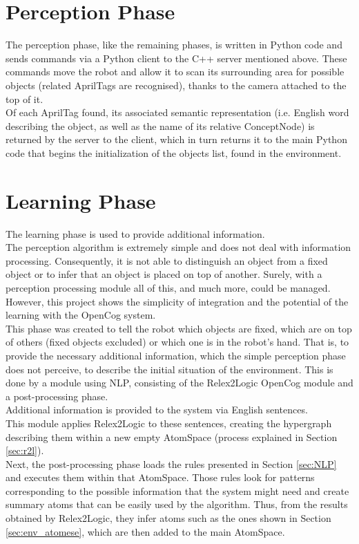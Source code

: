 \section{Perception Phase}\label{sec:perception}

The perception phase, like the remaining phases, is written in Python code and sends commands via a Python client to the C++ server mentioned above. These commands move the robot and allow it to scan its surrounding area for possible objects (related AprilTags are recognised), thanks to the camera attached to the top of it. \\
Of each AprilTag found, its associated semantic representation (i.e. English word describing the object, as well as the name of its relative ConceptNode) is returned by the server to the client, which in turn returns it to the main Python code that begins the initialization of the objects list, found in the environment.

\section{Learning Phase}\label{sec:learning}

The learning phase is used to provide additional information. \\
The perception algorithm is extremely simple and does not deal with information processing. Consequently, it is not able to distinguish an object from a fixed object or to infer that an object is placed on top of another. Surely, with a perception processing module all of this, and much more, could be managed. \\
However, this project shows the simplicity of integration and the potential of the learning with the OpenCog system. \\

This phase was created to tell the robot which objects are fixed, which are on top of others (fixed objects excluded) or which one is in the robot's hand. That is, to provide the necessary additional information, which the simple perception phase does not perceive, to describe the initial situation of the environment.
This is done by a module using NLP, consisting of the Relex2Logic OpenCog module and a post-processing phase. \\

Additional information is provided to the system via English sentences. \\
This module applies Relex2Logic to these sentences, creating the hypergraph describing them within a new empty AtomSpace (process explained in Section \ref{sec:r2l}).  \\
Next, the post-processing phase loads the rules presented in Section \ref{sec:NLP} and executes them within that AtomSpace. Those rules look for patterns corresponding to the possible information that the system might need and create summary atoms that can be easily used by the algorithm. Thus, from the results obtained by Relex2Logic, they infer atoms such as the ones shown in Section \ref{sec:env_atomese}, which are then added to the main AtomSpace. \\

